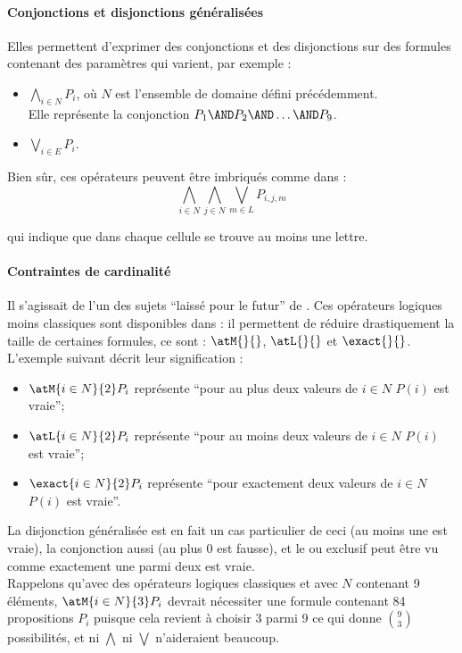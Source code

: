 \paragraph{Conjonctions et disjonctions généralisées}
Elles permettent d'exprimer des conjonctions et des disjonctions sur des formules contenant des paramètres qui varient, par exemple :
\begin{itemize}
\item $ \bigwedge_{i \in N} P_i$, où $N$ est l'ensemble de domaine défini précédemment.\\
  Elle représente la conjonction
  $P_1 \AND P_2 \AND \ldots \AND P_9$. 
\item $\bigvee_{i \in E} P_i$.
\end{itemize}

Bien s\^ur, ces opérateurs peuvent être imbriqués comme dans :
$$\bigwedge_{i \in N} \bigwedge_{j \in N}\bigvee_{ m\in L}P_{i,j,m}$$

qui indique que dans chaque cellule se trouve au moins une lettre.


\paragraph{Contraintes de cardinalité}
Il s'agissait de l'un des sujets \enquote{laissé pour le futur} de \cite{GaScSt2011}.
Ces opérateurs logiques moins classiques sont disponibles dans \touist : il permettent de réduire drastiquement la taille de certaines formules, ce sont : $\atM{}{}$, $\atL{}{}$ et $\exact{}{}$.\\ L'exemple suivant décrit leur signification :
\begin{itemize}
\item $\atM{i \in N}{2} P_i$ représente \enquote{pour au plus deux valeurs de $i \in N$ $P(i)$ est vraie};
\item $\atL{i \in N}{2} P_i$ représente \enquote{pour au moins deux valeurs de $i \in N$ $P(i)$ est vraie};
\item $\exact{i \in N}{2} P_i$ représente \enquote{pour exactement deux valeurs de $i \in N$ $P(i)$ est vraie}.
\end{itemize}
La disjonction généralisée est en fait un cas particulier de ceci (au moins une est vraie), la conjonction aussi (au plus 0 est fausse), et le ou exclusif peut être vu comme exactement une parmi deux est vraie. \\
Rappelons qu'avec des opérateurs logiques classiques et avec $N$ contenant 9 éléments, $\atM{i \in N}{3} P_i$ devrait nécessiter une formule contenant 84 propositions $P_i$ puisque cela revient à choisir 3 parmi 9 ce qui donne $\binom{9}{3}$ possibilités, et ni $\bigwedge$ ni $\bigvee$ n'aideraient beaucoup. 

